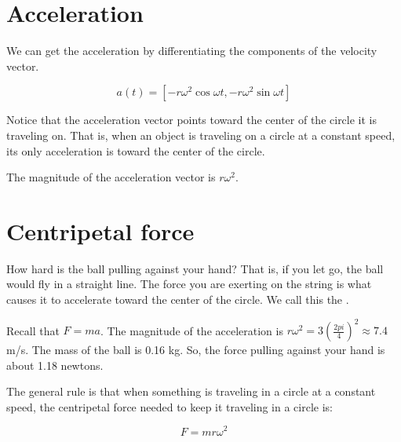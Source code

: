 \section{Acceleration}

We can get the acceleration by differentiating the components of the velocity vector.

$$a(t) = \left[-r \omega^2 \cos{\omega t}, -r \omega^2 \sin{\omega t} \right]$$

Notice that the acceleration vector points toward the center of the
circle it is traveling on.  That is, when an object is traveling on a
circle at a constant speed, its only acceleration is toward the center
of the circle.


The magnitude of the acceleration vector is $r \omega^2$.

\section{Centripetal force}

How hard is the ball pulling against your hand?  That is, if you let
go, the ball would fly in a straight line.  The force you are exerting
on the string is what causes it to accelerate toward the center of the
circle. We call this the .

Recall that $F = m a$.  The magnitude of the acceleration is $r
\omega^2 = 3 \left(\frac{2 pi}{4}\right)^2 \approx 7.4$ m/s.  The mass
of the ball is 0.16 kg.  So, the force pulling against your hand is
about 1.18 newtons.

The general rule is that when something is traveling in a circle at a
constant speed, the centripetal force needed to keep it traveling in a
circle is:

$$F = m r \omega^2$$

